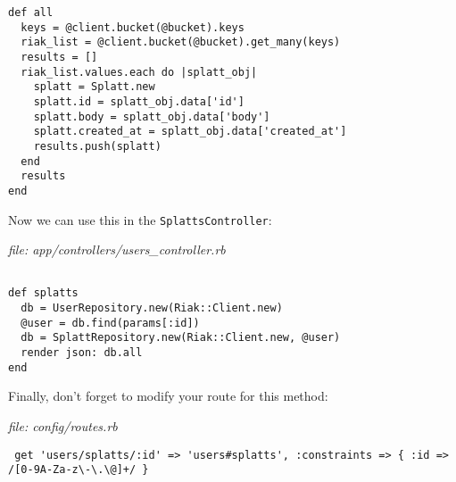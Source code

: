 \documentclass{article}
\begin{document}
\begin{verbatim}
def all
  keys = @client.bucket(@bucket).keys
  riak_list = @client.bucket(@bucket).get_many(keys)
  results = []
  riak_list.values.each do |splatt_obj|
    splatt = Splatt.new
    splatt.id = splatt_obj.data['id']
    splatt.body = splatt_obj.data['body']
    splatt.created_at = splatt_obj.data['created_at']
    results.push(splatt)
  end
  results
end
\end{verbatim}

Now we can use this in the \texttt{SplattsController}:

\emph{file: app/controllers/users\_controller.rb}
\begin{verbatim}
  
def splatts
  db = UserRepository.new(Riak::Client.new)
  @user = db.find(params[:id])
  db = SplattRepository.new(Riak::Client.new, @user)
  render json: db.all
end
\end{verbatim}

Finally, don't forget to modify your route for this method:

\emph{file:  config/routes.rb}
\begin{verbatim}
 get 'users/splatts/:id' => 'users#splatts', :constraints => { :id => /[0-9A-Za-z\-\.\@]+/ }
 \end{verbatim}
 
\end{document}
